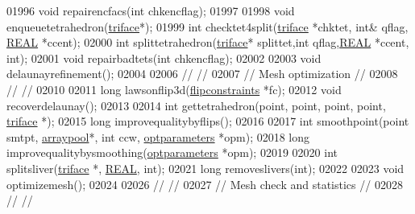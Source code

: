\begin{DoxyCode}
01996   \textcolor{keywordtype}{void} repairencfacs(\textcolor{keywordtype}{int} chkencflag);
01997 
01998   \textcolor{keywordtype}{void} enqueuetetrahedron(\hyperlink{classtetgenmesh_1_1triface}{triface}*);
01999   \textcolor{keywordtype}{int} checktet4split(\hyperlink{classtetgenmesh_1_1triface}{triface} *chktet, \textcolor{keywordtype}{int}& qflag, \hyperlink{tetgen_8h_a4b654506f18b8bfd61ad2a29a7e38c25}{REAL} *ccent);
02000   \textcolor{keywordtype}{int} splittetrahedron(\hyperlink{classtetgenmesh_1_1triface}{triface}* splittet,\textcolor{keywordtype}{int} qflag,\hyperlink{tetgen_8h_a4b654506f18b8bfd61ad2a29a7e38c25}{REAL} *ccent, \textcolor{keywordtype}{int});
02001   \textcolor{keywordtype}{void} repairbadtets(\textcolor{keywordtype}{int} chkencflag);
02002 
02003   \textcolor{keywordtype}{void} delaunayrefinement();
02004 
02006 \textcolor{comment}{//                                                                           //}
02007 \textcolor{comment}{// Mesh optimization                                                         //}
02008 \textcolor{comment}{//                                                                           //}
02010 \textcolor{comment}{}
02011   \textcolor{keywordtype}{long} lawsonflip3d(\hyperlink{classtetgenmesh_1_1flipconstraints}{flipconstraints} *fc);
02012   \textcolor{keywordtype}{void} recoverdelaunay();
02013 
02014   \textcolor{keywordtype}{int}  gettetrahedron(point, point, point, point, \hyperlink{classtetgenmesh_1_1triface}{triface} *);
02015   \textcolor{keywordtype}{long} improvequalitybyflips();
02016 
02017   \textcolor{keywordtype}{int}  smoothpoint(point smtpt, \hyperlink{classtetgenmesh_1_1arraypool}{arraypool}*, \textcolor{keywordtype}{int} ccw, \hyperlink{classtetgenmesh_1_1optparameters}{optparameters} *opm);
02018   \textcolor{keywordtype}{long} improvequalitybysmoothing(\hyperlink{classtetgenmesh_1_1optparameters}{optparameters} *opm);
02019 
02020   \textcolor{keywordtype}{int}  splitsliver(\hyperlink{classtetgenmesh_1_1triface}{triface} *, \hyperlink{tetgen_8h_a4b654506f18b8bfd61ad2a29a7e38c25}{REAL}, \textcolor{keywordtype}{int});
02021   \textcolor{keywordtype}{long} removeslivers(\textcolor{keywordtype}{int});
02022 
02023   \textcolor{keywordtype}{void} optimizemesh();
02024 
02026 \textcolor{comment}{//                                                                           //}
02027 \textcolor{comment}{// Mesh check and statistics                                                 //}
02028 \textcolor{comment}{//                                                                           //}

\end{DoxyCode}
